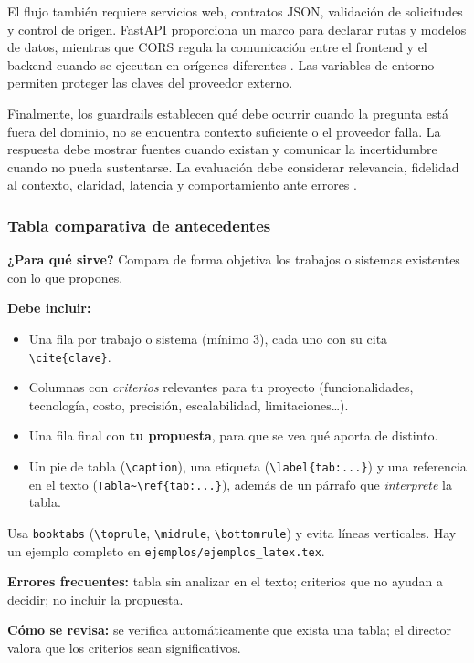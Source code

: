 El flujo también requiere servicios web, contratos JSON, validación de solicitudes y control de origen. FastAPI proporciona un marco para declarar rutas y modelos de datos, mientras que CORS regula la comunicación entre el frontend y el backend cuando se ejecutan en orígenes diferentes \cite{fastapiDocs}. Las variables de entorno permiten proteger las claves del proveedor externo.

Finalmente, los guardrails establecen qué debe ocurrir cuando la pregunta está fuera del dominio, no se encuentra contexto suficiente o el proveedor falla. La respuesta debe mostrar fuentes cuando existan y comunicar la incertidumbre cuando no pueda sustentarse. La evaluación debe considerar relevancia, fidelidad al contexto, claridad, latencia y comportamiento ante errores \cite{nistAirmf}.


\subsubsection{Tabla comparativa de antecedentes} \label{subsec:tabla_comparativa_antecedentes} %

\begin{guia}
\textbf{¿Para qué sirve?} Compara de forma objetiva los trabajos o sistemas existentes con lo que propones.

\textbf{Debe incluir:}
\begin{itemize}[nosep,leftmargin=*]
  \item Una fila por trabajo o sistema (mínimo 3), cada uno con su cita \verb|\cite{clave}|.
  \item Columnas con \emph{criterios} relevantes para tu proyecto (funcionalidades, tecnología, costo, precisión,
        escalabilidad, limitaciones\ldots).
  \item Una fila final con \textbf{tu propuesta}, para que se vea qué aporta de distinto.
  \item Un pie de tabla (\verb|\caption|), una etiqueta (\verb|\label{tab:...}|) y una referencia en el texto
        (\verb|Tabla~\ref{tab:...}|), además de un párrafo que \emph{interprete} la tabla.
\end{itemize}
Usa \verb|booktabs| (\verb|\toprule|, \verb|\midrule|, \verb|\bottomrule|) y evita líneas verticales. Hay un ejemplo
completo en \texttt{ejemplos/ejemplos\_latex.tex}.

\textbf{Errores frecuentes:} tabla sin analizar en el texto; criterios que no ayudan a decidir; no incluir la propuesta.

\textbf{Cómo se revisa:} se verifica automáticamente que exista una tabla; el director valora que los criterios sean
significativos.
\end{guia}

